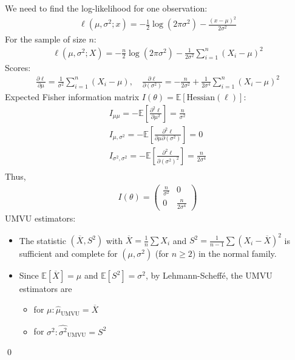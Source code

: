 \documentclass[10pt]{article}
\begin{document}
We need to find the log-likelihood for one observation: 
\begin{gather*}
    \ell(\mu, \sigma^2; x) = -\frac{1}{2}\log(2\pi\sigma^2) - \frac{(x - \mu)^2}{2\sigma^2}
\end{gather*}
For the sample of size $n $:
\begin{gather*}
    \ell(\mu, \sigma^2; X) = -\frac{n}{2}\log(2\pi\sigma^2) -\frac{1}{2\sigma^2}\sum_{i = 1}^{n}(X_i - \mu)^2
\end{gather*}
Scores:
\begin{gather*}
    \frac{\partial\ell}{\partial\mu} = \frac{1}{\sigma^2}\sum_{i = 1}^{n}(X_i - \mu), \quad \frac{\partial\ell}{\partial(\sigma^2)} = -\frac{n}{2\sigma^2} + \frac{1}{2\sigma^4}\sum_{i = 1}^{n}(X_i - \mu)^2
\end{gather*}
Expected Fisher information matrix $I(\theta) = \mathbb{E}[\text{Hessian}(\ell)]$:
\begin{gather*}
    I_{\mu\mu} = -\mathbb{E}\left[\frac{\partial^2\ell}{\partial\mu^2}\right] = \frac{n}{\sigma^2}\\
    I_{\mu,\sigma^2} = -\mathbb{E}\left[\frac{\partial^2\ell}{\partial\mu\partial(\sigma^2)}\right] = 0\\
    I_{\sigma^2,\sigma^2} = -\mathbb{E}\left[\frac{\partial^2\ell}{\partial(\sigma^2)^2}\right] = \frac{n}{2\sigma^4}\\
\end{gather*}
Thus,
\begin{gather*}
    I(\theta) = \begin{pmatrix}
        \frac{n}{\sigma^2} & 0 \\
        0 & \frac{n}{2\sigma^4}
    \end{pmatrix}
\end{gather*}
UMVU estimators:
\begin{itemize}
    \item The statistic $(\overline{X}, S^2)$ with $\overline{X} = \frac{1}{n}\sum X_i $ and $S^2 = \frac{1}{n - 1}\sum (X_i - \overline{X})^2 $ is sufficient and complete for $(\mu, \sigma^2)$ (for $n \ge 2 $) in the normal family.
    \item Since $\mathbb{E}[\overline{X}] = \mu $ and $\mathbb{E}[S^2] = \sigma^2 $, by Lehmann-Scheffé, the UMVU estimators are 
    \begin{itemize}
        \item for $\mu: \hat{\mu}_{\text{UMVU}} = \overline{X}$
        \item for $\sigma^2: \widehat{\sigma^2}_{\text{UMVU}} = S^2$
    \end{itemize}
\end{itemize}
\qed
\end{document}
